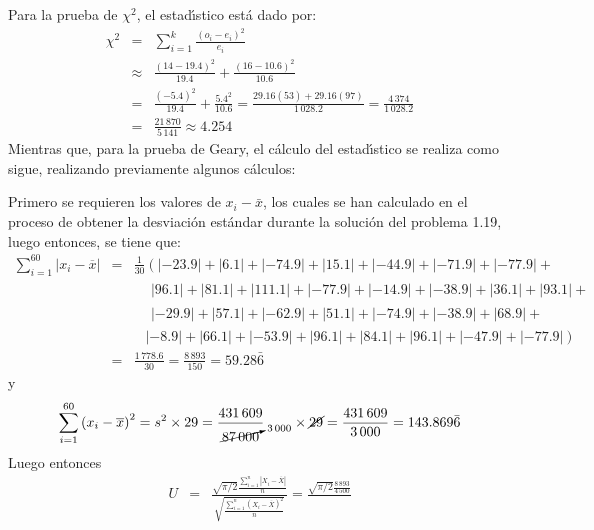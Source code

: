 \begin{solucion}
 \begin{estadistico}
  Para la prueba de $\chi^2$, el estad\'{\i}stico est\'a dado por:
  \begin{eqnarray*}
   \chi^2 & = & \sum_{i=1}^{k} \frac{\left( o_i - e_i \right)^2}{e_i} \\
   & \approx & \frac{(14-19.4)^2}{19.4} + \frac{(16-10.6)^2}{10.6} \\
   & = & \frac{(-5.4)^2}{19.4} + \frac{5.4^2}{10.6}
   = \frac{29.16(53) + 29.16(97)}{1\,028.2}
   = \frac{4\,374}{1\,028.2} \\
   & = & \frac{21\,870}{5\,141} \approx 4.254
  \end{eqnarray*}
  Mientras que, para la prueba de Geary, el c\'alculo del estad\'{\i}stico
  se realiza como sigue, realizando previamente algunos c\'alculos:
  \par 
  Primero se requieren los valores de $x_i - \bar{x}$, los cuales se
  han calculado en el proceso de obtener la desviaci\'on est\'andar
  durante la soluci\'on del problema 1.19, luego entonces, se tiene que:
  \begin{eqnarray*}
   \sum_{i=1}^{60} \left| x_i - \overline{x} \right| & = &
   \frac{1}{30}\left( |-23.9| + |6.1| + |-74.9| + |15.1| + |-44.9| + |-71.9| +
   |-77.9| + \right. \\
   & & \phantom{\frac{1}{60}(}  |96.1| + |81.1| + |111.1| + |-77.9| + |-14.9| +
   |-38.9| + |36.1| + |93.1| + \\
   & & \phantom{\frac{1}{60}(} |-29.9| + |57.1| + |-62.9| + |51.1| + |-74.9| +
   |-38.9| + |68.9| + \\
   & & \phantom{\frac{1}{60}} \left. |-8.9| + |66.1| + |-53.9| + |96.1| + 
   |84.1| + |96.1| + |-47.9| + |-77.9| \right) \\
   & = & \frac{1\,778.6}{30} = \frac{8\,893}{150} = 59.28\bar{6}
  \end{eqnarray*}
  y
  \begin{equation*}
   \sum_{i=1}^{60} \left( x_i - \overline{x} \right)^2 = s^2\times 29 =
   \frac{431\,609}{\cancelto{3\,000}{87\,000}}\hspace{0.7cm}\times \cancel{29}
   = \frac{431\,609}{3\,000} = 143.869\bar{6}
  \end{equation*}
  Luego entonces
  \begin{eqnarray*}
   U & = & \frac{
   \displaystyle{\sqrt{\pi/2}
   \frac{\sum_{i=1}^n \left| X_i - \overline{X} \right|}{n}}
   }{
   \displaystyle{\sqrt{
   \frac{\sum_{i =1}^n \left( X_i - \overline{X} \right)^2}{n}}}
   } 
   = \frac{\displaystyle{\sqrt{\pi/2} \frac{8\,893}{4\,500}}}{
}
\end{eqnarray*}
\end{estadistico}
\end{solucion}
